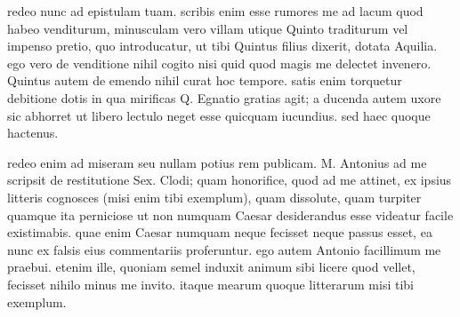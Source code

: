  redeo nunc ad epistulam tuam. scribis enim esse rumores me ad lacum quod habeo venditurum, minusculam vero villam utique Quinto traditurum vel impenso pretio, quo introducatur, ut tibi Quintus filius dixerit, dotata Aquilia. ego vero de venditione nihil cogito nisi quid quod magis me delectet invenero. Quintus autem de emendo nihil curat hoc tempore. satis enim torquetur debitione dotis in qua mirificas Q. Egnatio gratias agit; a ducenda autem uxore sic abhorret ut libero lectulo neget esse quicquam iucundius. sed haec quoque hactenus.

 redeo enim ad miseram seu nullam potius rem publicam. M. Antonius ad me scripsit de restitutione Sex. Clodi; quam honorifice, quod ad me attinet, ex ipsius litteris cognosces (misi enim tibi exemplum), quam dissolute, quam turpiter quamque ita perniciose ut non numquam Caesar desiderandus esse videatur facile existimabis. quae enim Caesar numquam neque fecisset neque passus esset, ea nunc ex falsis eius commentariis proferuntur. ego autem Antonio facillimum me praebui. etenim ille, quoniam semel induxit animum sibi licere quod vellet, fecisset nihilo minus me invito. itaque mearum quoque litterarum misi tibi exemplum.
